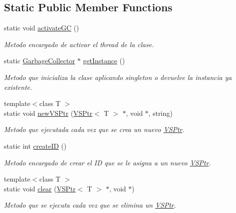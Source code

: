 \subsection*{Static Public Member Functions}
\begin{DoxyCompactItemize}
\item 
static void \hyperlink{class_garbage_collector_a27c184268b99ce54d9dc41e0814761d3}{activate\+GC} ()
\begin{DoxyCompactList}\small\item\em Metodo encargado de activar el thread de la clase. \end{DoxyCompactList}\item 
static \hyperlink{class_garbage_collector}{Garbage\+Collector} $\ast$ \hyperlink{class_garbage_collector_ade4bccdf41223cc395b646db3f60ac8b}{get\+Instance} ()
\begin{DoxyCompactList}\small\item\em Metodo que inicializa la clase aplicando singleton o devuelve la instancia ya existente. \end{DoxyCompactList}\item 
{\footnotesize template$<$class T $>$ }\\static void \hyperlink{class_garbage_collector_abd2b578c51fe5f8634da54c698e3e4dd}{new\+V\+S\+Ptr} (\hyperlink{class_v_s_ptr}{V\+S\+Ptr}$<$ T $>$ $\ast$, void $\ast$, string)
\begin{DoxyCompactList}\small\item\em Metodo que ejecutada cada vez que se crea un nuevo \hyperlink{class_v_s_ptr}{V\+S\+Ptr}. \end{DoxyCompactList}\item 
static int \hyperlink{class_garbage_collector_ae58afa45c7554355f2536229db34613c}{create\+ID} ()
\begin{DoxyCompactList}\small\item\em Metodo encargado de crear el ID que se le asigna a un nuevo \hyperlink{class_v_s_ptr}{V\+S\+Ptr}. \end{DoxyCompactList}\item 
{\footnotesize template$<$class T $>$ }\\static void \hyperlink{class_garbage_collector_a0e2f7b2ce7b6af3f3b1ee9b52d3d1b01}{clear} (\hyperlink{class_v_s_ptr}{V\+S\+Ptr}$<$ T $>$ $\ast$, void $\ast$)
\begin{DoxyCompactList}\small\item\em Metodo que se ejecuta cada vez que se elimina un \hyperlink{class_v_s_ptr}{V\+S\+Ptr}. \end{DoxyCompactList}\end{DoxyCompactItemize}
